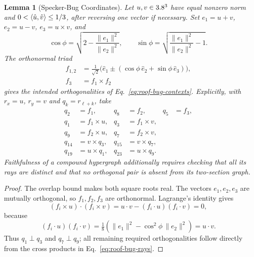 \documentclass[aps,pra,reprint,superscriptaddress,longbibliography,nofootinbib,floatfix,10pt]{revtex4-2}
\newtheorem{lemma}[theorem]{Lemma}
\theoremstyle{definition}\newtheorem{definition}[theorem]{Definition}
\theoremstyle{remark}\newtheorem{remark}[theorem]{Remark}
\begin{document}
\begin{lemma}[Specker-Bug Coordinates]\label{lem:bug-triad}
Let $u,v\in3.8^3$ have equal nonzero norm and
$0<\langle \hat u,\hat v\rangle\le1/3$, after reversing one vector if necessary. Set $e_1=u+v$, $e_2=u-v$, $e_3=u\times v$, and
\begin{equation}\label{eq:universal-phi}
\cos\phi=\sqrt{2-\frac{\|e_1\|^2}{\|e_2\|^2}},\qquad
\sin\phi=\sqrt{\frac{\|e_1\|^2}{\|e_2\|^2}-1}.
\end{equation}
The orthonormal triad
\begin{equation}\label{eq:universal-triad}
\begin{aligned}
f_{1,2}&=\tfrac1{\sqrt2}\bigl(\hat e_1\pm
 (\cos\phi\,\hat e_2+\sin\phi\,\hat e_3)\bigr),\\
f_3&=f_1\times f_2
\end{aligned}
\end{equation}
gives the intended orthogonalities of Eq.~\eqref{eq:roof-bug-contexts}. Explicitly, with $r_x=u$, $r_y=v$ and $q_k=r_{\ell+k}$, take
\begin{equation}\label{eq:roof-bug-rays}
\begin{aligned}
q_2&=f_1,& q_8&=f_2,&q_5&=f_3,\\
q_1&=f_1\times u,&q_3&=f_1\times v,\\
q_9&=f_2\times u,&q_7&=f_2\times v,\\
q_{14}&=v\times q_3,&q_{15}&=v\times q_7,\\
q_{19}&=u\times q_1,&q_{23}&=u\times q_9.
\end{aligned}
\end{equation}
Faithfulness of a compound hypergraph additionally requires checking that all its rays are distinct and that no orthogonal pair is absent from its two-section graph.
\end{lemma}
\begin{proof}
The overlap bound makes both square roots real. The vectors $e_1,e_2,e_3$ are mutually orthogonal, so $f_1,f_2,f_3$ are orthonormal. Lagrange's identity gives
\[
(f_i\times u)\cdot(f_i\times v)
=u\cdot v-(f_i\cdot u)(f_i\cdot v)=0,
\]
because
\[
(f_i\cdot u)(f_i\cdot v)
=\tfrac18(\|e_1\|^2-\cos^2\phi\,\|e_2\|^2)
=u\cdot v.
\]
Thus $q_1\perp q_3$ and $q_7\perp q_9$; all remaining required orthogonalities follow directly from the cross products in Eq.~\eqref{eq:roof-bug-rays}.
\end{proof}
\end{document}

